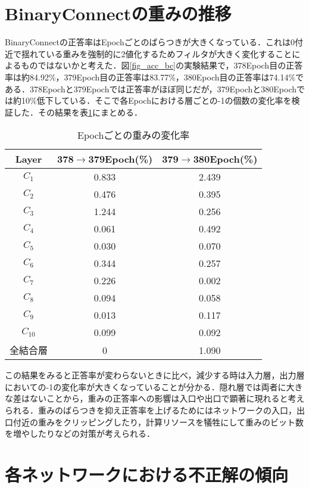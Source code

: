 \section{BinaryConnectの重みの推移}
BinaryConnectの正答率はEpochごとのばらつきが大きくなっている．これは0付近で揺れている重みを強制的に2値化するためフィルタが大きく変化することによるものではないかと考えた．図\ref{fig_acc_bc}の実験結果で，378Epoch目の正答率は約84.92\%，379Epoch目の正答率は83.77\%，380Epoch目の正答率は74.14\%である．378Epochと379Epochでは正答率がほぼ同じだが，379Epochと380Epochでは約10\%低下している．そこで各Epochにおける層ごとの-1の個数の変化率を検証した．その結果を表\ref{table_parameter_transition}にまとめる．
\begin{table}
  \caption{Epochごとの重みの変化率}
  \label{table_parameter_transition}
  \centering
  \begin{tabular}{ccc}
    \hline
    Layer & 378$\to$379Epoch(\%) & 379$\to$380Epoch(\%) \\
    \hline \hline
    $C_1$ & 0.833 & 2.439\\
    $C_2$ & 0.476 & 0.395\\
    $C_3$ & 1.244 & 0.256\\
    $C_4$ & 0.061 & 0.492\\
    $C_5$ & 0.030 & 0.070\\
    $C_6$ & 0.344 & 0.257\\
    $C_7$ & 0.226 & 0.002\\
    $C_8$ & 0.094 & 0.058\\
    $C_9$ & 0.013 & 0.117\\
    $C_{10}$ & 0.099 & 0.092\\
    全結合層 & 0 & 1.090\\
    \hline
  \end{tabular}
\end{table}

この結果をみると正答率が変わらないときに比べ，減少する時は入力層，出力層においての-1の変化率が大きくなっていることが分かる．隠れ層では両者に大きな差はないことから，重みの正答率への影響は入口や出口で顕著に現れると考えられる．重みのばらつきを抑え正答率を上げるためにはネットワークの入口，出口付近の重みをクリッピングしたり，計算リソースを犠牲にして重みのビット数を増やしたりなどの対策が考えられる．

\section{各ネットワークにおける不正解の傾向}